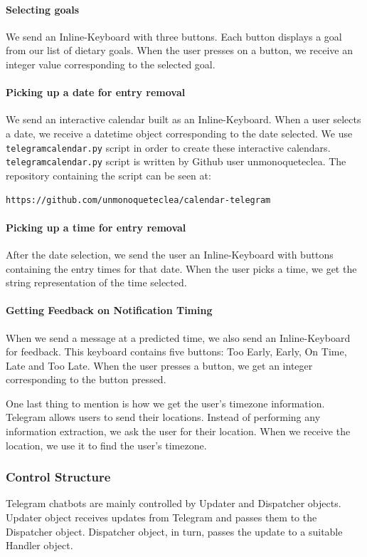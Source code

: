 \paragraph{Selecting goals} 
We send an Inline-Keyboard with three buttons. 
Each button displays a goal from our list of dietary goals. 
When the user presses on a button, we receive an integer value corresponding to the selected goal.

\paragraph{Picking up a date for entry removal} 
We send an interactive calendar built as an Inline-Keyboard.
When a user selects a date, we receive a datetime object corresponding to the date selected.
We use \texttt{telegramcalendar.py} script in order to create these interactive calendars.
\texttt{telegramcalendar.py} script is written by Github user unmonoqueteclea.
The repository containing the script can be seen at:

\texttt{https://github.com/unmonoqueteclea/calendar-telegram}

\paragraph{Picking up a time for entry removal} 
After the date selection, we send the user an Inline-Keyboard with buttons containing the entry times for that date.
When the user picks a time, we get the string representation of the time selected.

\paragraph{Getting Feedback on Notification Timing} 
When we send a message at a predicted time, we also send an Inline-Keyboard for feedback.
This keyboard contains five buttons: Too Early, Early, On Time, Late and Too Late.
When the user presses a button, we get an integer corresponding to the button pressed.

One last thing to mention is how we get the user's timezone information.
Telegram allows users to send their locations.
Instead of performing any information extraction, we ask the user for their location.
When we receive the location, we use it to find the user's timezone.

\subsubsection{Control Structure}
Telegram chatbots are mainly controlled by Updater and Dispatcher objects.
Updater object receives updates from Telegram and passes them to the Dispatcher object.
Dispatcher object, in turn, passes the update to a suitable Handler object.

